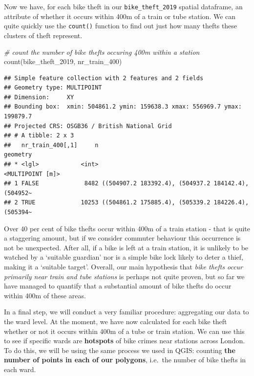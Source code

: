 \documentclass[
]{book}
\newenvironment{Shaded}{\begin{snugshade}}{\end{snugshade}}
\newcommand{\CommentTok}[1]{\textcolor[rgb]{0.56,0.35,0.01}{\textit{#1}}}
\newcommand{\FunctionTok}[1]{\textcolor[rgb]{0.00,0.00,0.00}{#1}}
\newcommand{\NormalTok}[1]{#1}
\begin{document}
Now we have, for each bike theft in our \texttt{bike\_theft\_2019} spatial dataframe, an attribute of whether it occurs within 400m of a train or tube station. We can quite quickly use the \texttt{count()} function to find out just how many thefts these clusters of theft represent.

\begin{Shaded}
\begin{Highlighting}[]
\CommentTok{\# count the number of bike thefts occuring 400m within a station}
\FunctionTok{count}\NormalTok{(bike\_theft\_2019, nr\_train\_400)}
\end{Highlighting}
\end{Shaded}

\begin{verbatim}
## Simple feature collection with 2 features and 2 fields
## Geometry type: MULTIPOINT
## Dimension:     XY
## Bounding box:  xmin: 504861.2 ymin: 159638.3 xmax: 556969.7 ymax: 199879.7
## Projected CRS: OSGB36 / British National Grid
## # A tibble: 2 x 3
##   nr_train_400[,1]     n                                            geometry
## * <lgl>            <int>                                    <MULTIPOINT [m]>
## 1 FALSE             8482 ((504907.2 183392.4), (504937.2 184142.4), (504952~
## 2 TRUE             10253 ((504861.2 175885.4), (505339.2 184226.4), (505394~
\end{verbatim}

Over 40 per cent of bike thefts occur within 400m of a train station - that is quite a staggering amount, but if we consider commuter behaviour this occurrence is not be unexpected. After all, if a bike is left at a train station, it is unlikely to be watched by a `suitable guardian' nor is a simple bike lock likely to deter a thief, making it a `suitable target'. Overall, our main hypothesis that \emph{bike thefts occur primarily near train and tube stations } is perhaps not quite proven, but so far we have managed to quantify that a substantial amount of bike thefts do occur within 400m of these areas.

In a final step, we will conduct a very familiar procedure: aggregating our data to the ward level. At the moment, we have now calculated for each bike theft whether or not it occurs within 400m of a tube or train station. We can use this to see if specific wards are \textbf{hotspots} of bike crimes near stations across London. To do this, we will be using the same process we used in QGIS: counting \textbf{the number of points in each of our polygons}, i.e.~the number of bike thefts in each ward.
\end{document}

